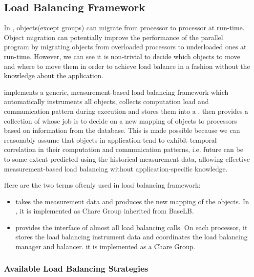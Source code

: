\subsection{Load Balancing Framework}
\label{lbFramework}

In \charmpp{}, objects(except groups) can migrate from processor to 
processor at run-time. Object migration can potentially improve the 
performance of the parallel program by migrating objects from overloaded 
processors to underloaded ones at run-time. However, we can see it is 
non-trivial to decide which objects to move and where to move them in 
order to achieve load balance in a fashion without the knowledge about the 
application. 

 \charmpp{} implements a generic, measurement-based load balancing framework 
which automatically instruments all \charmpp{} objects, collects computation 
load and communication pattern during execution and stores them into a 
. \charmpp{} then provides a collection of 
 whose job is to decide on a new mapping of 
objects to processors based on information from the database.
This is made possible because we can reasonably assume that objects 
in \charmpp{} application tend to exhibit temporal correlation in 
their computation and communication patterns, i.e. future can be to some 
extent predicted using the historical measurement data, allowing effective 
measurement-based load balancing without application-specific knowledge. 

Here are the two terms oftenly used in \charmpp{} load balancing framework:
\begin{itemize}
\item {} takes the measurement
   data and produces the new mapping of the objects. In \charmpp{}, it is
   implemented as Chare Group inherited from BaseLB.
\item {} provides the interface of almost all
   load balancing calls. On each processor, it stores the load 
   balancing instrument data and coordinates the load balancing manager and 
   balancer. it is implemented as a Chare Group.
\end{itemize}

\subsubsection{Available Load Balancing Strategies}
\label{lbStrategy}

